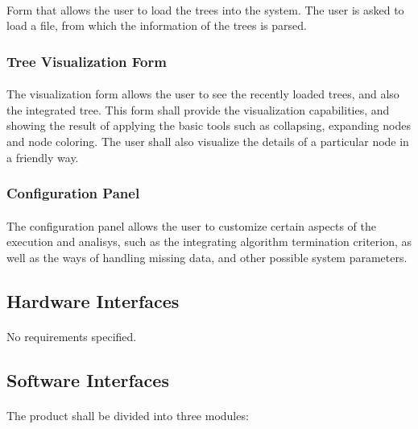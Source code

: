 \documentclass[10pt,a4paper]{article}
\begin{document}
\paragraph{}
Form that allows the user to load the trees into the system. The user is asked to load a file, from which the information of the trees is parsed.
\subsubsection{Tree Visualization Form}
\paragraph{}
The visualization form allows the user to see the recently loaded trees, and also the integrated tree. This form shall provide the visualization capabilities, and showing the result of applying the basic tools such as collapsing, expanding nodes and node coloring. The user shall also visualize the details of a particular node in a friendly way.
\subsubsection{Configuration Panel}
\paragraph{}
The configuration panel allows the user to customize certain aspects of the execution and analisys, such as the integrating algorithm termination criterion, as well as the ways of handling missing data, and other possible system parameters.


    \subsection{Hardware Interfaces}
\paragraph{}
    No requirements specified.

\subsection{Software Interfaces}
\paragraph{}
The product shall be divided into three modules:	
\end{document}
